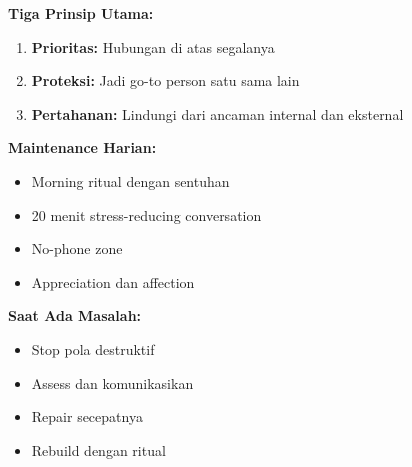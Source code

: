 \begin{tipbox}
\textbf{Tiga Prinsip Utama:}
\begin{enumerate}
    \item \textbf{Prioritas:} Hubungan di atas segalanya
    \item \textbf{Proteksi:} Jadi go-to person satu sama lain
    \item \textbf{Pertahanan:} Lindungi dari ancaman internal dan eksternal
\end{enumerate}

\textbf{Maintenance Harian:}
\begin{itemize}
    \item[$\checkmark$] Morning ritual dengan sentuhan
    \item[$\checkmark$] 20 menit stress-reducing conversation
    \item[$\checkmark$] No-phone zone
    \item[$\checkmark$] Appreciation dan affection
\end{itemize}

\textbf{Saat Ada Masalah:}
\begin{itemize}
    \item Stop pola destruktif
    \item Assess dan komunikasikan
    \item Repair secepatnya
    \item Rebuild dengan ritual
\end{itemize}
\end{tipbox}
